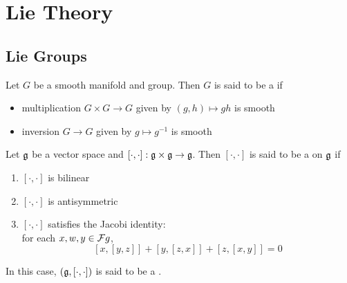 \documentclass{book}
\begin{document}
\newpage
\chapter{Lie Theory}

\section{Lie Groups}

\begin{defn}
	Let $G$ be a smooth manifold and group. Then $G$ is said to be a  if 
	\begin{itemize}
		\item multiplication $G \times G \rightarrow G$ given by $(g, h) \mapsto gh$ is smooth
		\item inversion $G \rightarrow G$  given by $g \mapsto g^{-1}$ is smooth 
	\end{itemize} 
\end{defn}




\begin{defn}
	Let $\mathfrak{g}$ be a vector space and $[\cdot, \cdot]: \mathfrak{g} \times \mathfrak{g} \rightarrow \mathfrak{g}$. 
	Then $[\cdot, \cdot]$ is said to be a  on $\mathfrak{g}$ if  
	\begin{enumerate}
		\item $[\cdot, \cdot]$ is bilinear
		\item $[\cdot, \cdot]$ is antisymmetric
		\item $[\cdot, \cdot]$ satisfies the Jacobi identity: \\
		for each $x, w, y \in \mathcal{F} g$, 
		$$[x, [y,z]] + [y, [z,x]] + [z, [x,y]] = 0$$
	\end{enumerate}
	In this case, $(\mathfrak{g}, [\cdot, \cdot])$ is said to be a .
\end{defn}
\end{document}
